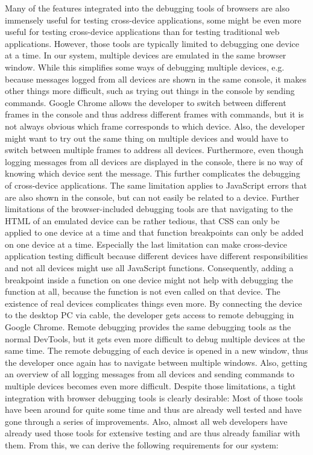 Many of the features integrated into the debugging tools of browsers are also immensely useful for testing cross-device applications, some might be even more useful for testing cross-device applications than for testing traditional web applications. However, those tools are typically limited to debugging one device at a time. In our system, multiple devices are emulated in the same browser window. While this simplifies some ways of debugging multiple devices, e.g. because messages logged from all devices are shown in the same console, it makes other things more difficult, such as trying out things in the console by sending commands. Google Chrome allows the developer to switch between different frames in the console and thus address different frames with commands, but it is not always obvious which frame corresponds to which device. Also, the developer might want to try out the same thing on multiple devices and would have to switch between multiple frames to address all devices. Furthermore, even though logging messages from all devices are displayed in the console, there is no way of knowing which device sent the message. This further complicates the debugging of cross-device applications. The same limitation applies to JavaScript errors that are also shown in the console, but can not easily be related to a device. Further limitations of the browser-included debugging tools are that navigating to the HTML of an emulated device can be rather tedious, that CSS can only be applied to one device at a time and that function breakpoints can only be added on one device at a time. Especially the last limitation can make cross-device application testing difficult because different devices have different responsibilities and not all devices might use all JavaScript functions. Consequently, adding a breakpoint inside a function on one device might not help with debugging the function at all, because the function is not even called on that device. The existence of real devices complicates things even more. By connecting the device to the desktop PC via cable, the developer gets access to remote debugging in Google Chrome. Remote debugging provides the same debugging tools as the normal DevTools, but it gets even more difficult to debug multiple devices at the same time. The remote debugging of each device is opened in a new window, thus the developer once again has to navigate between multiple windows. Also, getting an overview of all logging messages from all devices and sending commands to multiple devices becomes even more difficult. Despite those limitations, a tight integration with browser debugging tools is clearly desirable: Most of those tools have been around for quite some time and thus are already well tested and have gone through a series of improvements. Also, almost all web developers have already used those tools for extensive testing and are thus already familiar with them. From this, we can derive the following requirements for our system:
